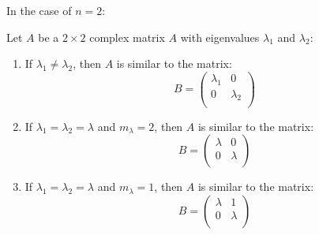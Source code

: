 \documentclass[../main.tex]{subfiles}
\begin{document}
In the case of $n = 2$:
\begin{proposition}
  Let $A$ be a $2 \times 2$ complex matrix $A$ with eigenvalues $\lambda_1$ and $\lambda_2$: \label{2x2Similar}
  \begin{enumerate}
    \item If $\lambda_1 \neq \lambda_2$, then $A$ is similar to the matrix:
      \[
        B = \begin{pmatrix}
        \lambda_1 & 0 \\
        0 & \lambda_2 \\
        \end{pmatrix}
      \]
    \item If $\lambda_1 = \lambda_2 = \lambda$ and $m_\lambda = 2$, then $A$ is similar to the matrix:
      \[
        B = \begin{pmatrix}
        \lambda & 0 \\
        0 & \lambda \\
        \end{pmatrix}
      \]
    \item If $\lambda_1 = \lambda_2 = \lambda$ and $m_\lambda = 1$, then $A$ is similar to the matrix:
      \[
        B = \begin{pmatrix}
        \lambda & 1 \\
        0 & \lambda \\
        \end{pmatrix}
      \]
  \end{enumerate}
\end{proposition}
\end{document}
